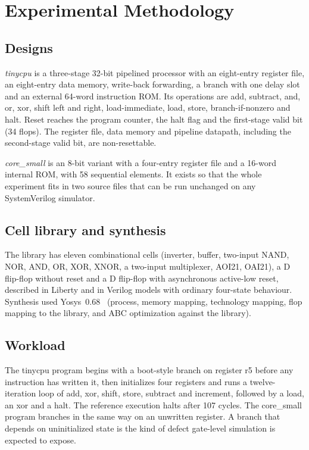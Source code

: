 \documentclass[journal]{IEEEtran}
\begin{document}
\section{Experimental Methodology}

\subsection{Designs}
\emph{tinycpu} is a three-stage 32-bit pipelined processor with an eight-entry
register file, an eight-entry data memory, write-back forwarding, a branch with
one delay slot and an external 64-word instruction ROM. Its operations are add,
subtract, and, or, xor, shift left and right, load-immediate, load, store,
branch-if-nonzero and halt. Reset reaches the program counter, the halt flag and
the first-stage valid bit (34 flops). The register file, data memory and pipeline
datapath, including the second-stage valid bit, are non-resettable.

\emph{core\_small} is an 8-bit variant with a four-entry register file and a
16-word internal ROM, with 58 sequential elements. It exists so that the whole
experiment fits in two source files that can be run unchanged on any
SystemVerilog simulator.

\subsection{Cell library and synthesis}
The library has eleven combinational cells (inverter, buffer, two-input NAND, NOR,
AND, OR, XOR, XNOR, a two-input multiplexer, AOI21, OAI21), a D flip-flop without
reset and a D flip-flop with asynchronous active-low reset, described in Liberty
and in Verilog models with ordinary four-state behaviour. Synthesis used
Yosys~0.68~\cite{yosys} (process, memory mapping, technology mapping, flop mapping
to the library, and ABC optimization against the library).

\subsection{Workload}
The tinycpu program begins with a boot-style branch on register r5 before any
instruction has written it, then initializes four registers and runs a
twelve-iteration loop of add, xor, shift, store, subtract and increment, followed
by a load, an xor and a halt. The reference execution halts after 107 cycles.
The core\_small program branches in the same way on an unwritten register. A
branch that depends on uninitialized state is the kind of defect gate-level
simulation is expected to expose.
\end{document}
